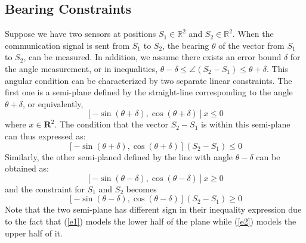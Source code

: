 \documentclass[journal]{IEEEtran}
\begin{document}
\subsection{Bearing Constraints}
Suppose we have two sensors at positions $S_1\in\mathbb{R}^2$ and $S_2\in\mathbb{R}^2$. When the communication signal is sent from $S_1$ to $S_2$, the bearing $\theta$ of the vector from $S_1$ to $S_2$, can be measured. In addition, we assume there exists an error bound $\delta$ for the angle measurement, or in inequalities, $\theta-\delta\leq\angle (S_2-S_1)\leq\theta+\delta$. This angular condition can be characterized by two separate linear constraints. The first one is a semi-plane defined by the straight-line corresponding to the angle $\theta+\delta$, or equivalently,
\begin{equation}\label{e1}
[-\sin(\theta+\delta),\cos(\theta+\delta)]x\leq0
\end{equation}
where $x\in\mathbf{R}^2$. The condition that the vector $S_2-S_1$ is within this semi-plane can thus expressed as:
\begin{equation}\label{e12}
[-\sin(\theta+\delta),\cos(\theta+\delta)](S_2-S_1)\leq 0
\end{equation}
Similarly, the other semi-planed defined by the line with angle $\theta-\delta$ can be obtained as:
\begin{equation}\label{e2}
[-\sin(\theta-\delta),\cos(\theta-\delta)]x\geq 0
\end{equation}
and the constraint for $S_1$ and $S_2$ becomes
\begin{equation}\label{e22}
[-\sin(\theta-\delta),\cos(\theta-\delta)](S_2-S_1)\geq 0
\end{equation}
Note that the two semi-plane has different sign in their inequality expression due to the fact that (\ref{e1}) models the lower half of the plane while (\ref{e2}) models the upper half of it.
\end{document}
